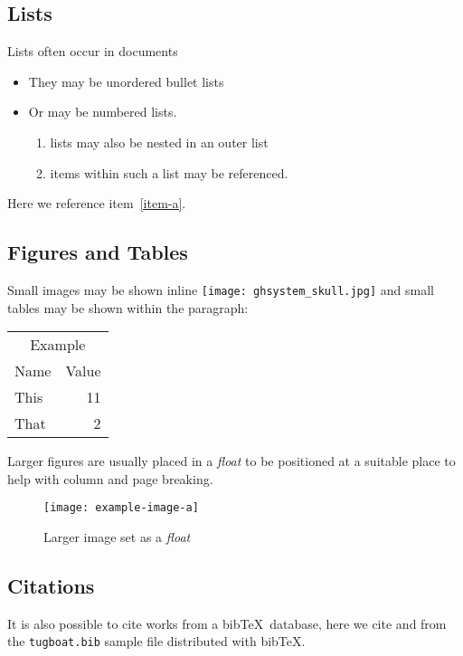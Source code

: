 \documentclass[a4paper,twocolumn]{article}
\providecommand\tagpdfsetup[1]{}
\begin{document}
\subsection{Lists}
Lists often occur in documents
\begin{itemize}
\item They may be unordered bullet lists
\item Or may be numbered lists.
  \begin{enumerate}
  \item lists may also be nested in an outer list
  \item \label{item-a}items within such a list may be referenced.
  \end{enumerate}
\end{itemize}
Here we reference item~\ref{item-a}.

\subsection{Figures and Tables}

Small images may be shown inline
\texttt{[image: ghsystem\_skull.jpg]}
and small tables may be shown within the paragraph:
\begin{center}
\tagpdfsetup{table/header-rows={1,2}}
\begin{tabular}{lr}
\multicolumn{2}{c}{Example}\\
Name&Value\\
This& 11 \\
That & 2
\end{tabular}
\end{center}

Larger figures are usually placed in a \emph{float} to be positioned at a suitable
place to help with column and page breaking.
\begin{figure}
  \centering
  \texttt{[image: example-image-a]}
  \caption{Larger image set as a \emph{float}}
\end{figure}

\subsection{Citations}
It is also possible to cite works from a bib\TeX\ database, here we
cite \cite{Knuth:TB5-1-67} and \cite{Hoekwater:TB28-3-312} from the
\texttt{tugboat.bib} sample file distributed with bib\TeX.


\raggedright

\end{document}
